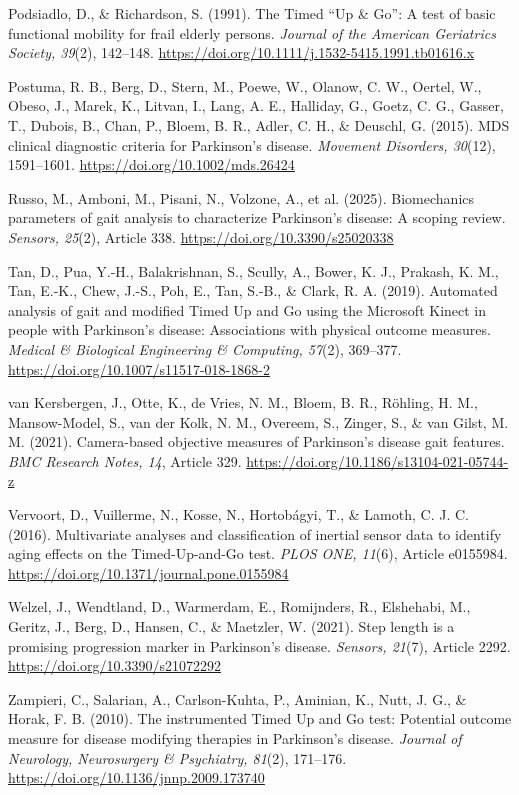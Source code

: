 \documentclass[12pt,a4paper]{article}
\newenvironment{referencias}{%
  \setlength{\parindent}{0pt}%
  \setlength{\parskip}{8pt}%
  \begingroup\raggedright\small
}{\endgroup}
\newcommand{\refitem}[1]{\par\hangindent=1.25cm\hangafter=1 #1\par}
\begin{document}
\begin{referencias}
\refitem{Podsiadlo, D., \& Richardson, S. (1991). The Timed ``Up \& Go'': A test of basic functional mobility for frail elderly persons. \emph{Journal of the American Geriatrics Society, 39}(2), 142--148. \url{https://doi.org/10.1111/j.1532-5415.1991.tb01616.x}}

\refitem{Postuma, R. B., Berg, D., Stern, M., Poewe, W., Olanow, C. W., Oertel, W., Obeso, J., Marek, K., Litvan, I., Lang, A. E., Halliday, G., Goetz, C. G., Gasser, T., Dubois, B., Chan, P., Bloem, B. R., Adler, C. H., \& Deuschl, G. (2015). MDS clinical diagnostic criteria for Parkinson's disease. \emph{Movement Disorders, 30}(12), 1591--1601. \url{https://doi.org/10.1002/mds.26424}}

\refitem{Russo, M., Amboni, M., Pisani, N., Volzone, A., et al. (2025). Biomechanics parameters of gait analysis to characterize Parkinson's disease: A scoping review. \emph{Sensors, 25}(2), Article 338. \url{https://doi.org/10.3390/s25020338}}

\refitem{Tan, D., Pua, Y.-H., Balakrishnan, S., Scully, A., Bower, K. J., Prakash, K. M., Tan, E.-K., Chew, J.-S., Poh, E., Tan, S.-B., \& Clark, R. A. (2019). Automated analysis of gait and modified Timed Up and Go using the Microsoft Kinect in people with Parkinson's disease: Associations with physical outcome measures. \emph{Medical \& Biological Engineering \& Computing, 57}(2), 369--377. \url{https://doi.org/10.1007/s11517-018-1868-2}}

\refitem{van Kersbergen, J., Otte, K., de Vries, N. M., Bloem, B. R., Röhling, H. M., Mansow-Model, S., van der Kolk, N. M., Overeem, S., Zinger, S., \& van Gilst, M. M. (2021). Camera-based objective measures of Parkinson's disease gait features. \emph{BMC Research Notes, 14}, Article 329. \url{https://doi.org/10.1186/s13104-021-05744-z}}

\refitem{Vervoort, D., Vuillerme, N., Kosse, N., Hortobágyi, T., \& Lamoth, C. J. C. (2016). Multivariate analyses and classification of inertial sensor data to identify aging effects on the Timed-Up-and-Go test. \emph{PLOS ONE, 11}(6), Article e0155984. \url{https://doi.org/10.1371/journal.pone.0155984}}


\refitem{Welzel, J., Wendtland, D., Warmerdam, E., Romijnders, R., Elshehabi, M., Geritz, J., Berg, D., Hansen, C., \& Maetzler, W. (2021). Step length is a promising progression marker in Parkinson's disease. \emph{Sensors, 21}(7), Article 2292. \url{https://doi.org/10.3390/s21072292}}

\refitem{Zampieri, C., Salarian, A., Carlson-Kuhta, P., Aminian, K., Nutt, J. G., \& Horak, F. B. (2010). The instrumented Timed Up and Go test: Potential outcome measure for disease modifying therapies in Parkinson's disease. \emph{Journal of Neurology, Neurosurgery \& Psychiatry, 81}(2), 171--176. \url{https://doi.org/10.1136/jnnp.2009.173740}}
\end{referencias}
\end{document}
